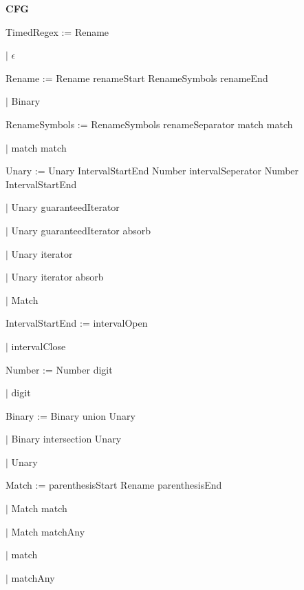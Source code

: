 
\textbf{CFG}

TimedRegex := Rename

\qquad	$\mid$ $\epsilon$

Rename := Rename renameStart RenameSymbols renameEnd

\qquad $\mid$ Binary

RenameSymbols := RenameSymbols renameSeparator match match

\qquad $\mid$ match match

Unary := Unary IntervalStartEnd Number intervalSeperator Number IntervalStartEnd

\qquad $\mid$ Unary guaranteedIterator

\qquad $\mid$ Unary guaranteedIterator absorb

\qquad $\mid$ Unary iterator

\qquad $\mid$ Unary iterator absorb

\qquad $\mid$ Match

IntervalStartEnd := intervalOpen

\qquad $\mid$ intervalClose

Number := Number digit

\qquad $\mid$ digit

Binary := Binary union Unary

\qquad $\mid$ Binary intersection Unary

\qquad $\mid$ Unary

Match := parenthesisStart Rename parenthesisEnd

\qquad $\mid$ Match match

\qquad $\mid$ Match matchAny

\qquad $\mid$ match

\qquad $\mid$ matchAny

